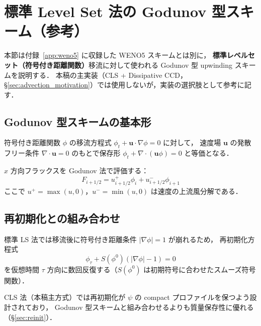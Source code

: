 \section{標準 Level Set 法の Godunov 型スキーム（参考）}
\label{app:godunov_ls}

本節は付録~\ref{app:weno5} に収録した WENO5 スキームとは別に，
\textbf{標準レベルセット（符号付き距離関数）}移流に対して使われる Godunov 型 upwinding スキームを説明する．
本稿の主実装（CLS + Dissipative CCD，§\ref{sec:advection_motivation}）では使用しないが，実装の選択肢として参考に記す．

\subsection{Godunov 型スキームの基本形}

符号付き距離関数 $\phi$ の移流方程式 $\phi_t + \bm{u}\cdot\nabla\phi = 0$ に対して，
速度場 $\bm{u}$ の発散フリー条件 $\nabla\cdot\bm{u}=0$ のもとで保存形 $\phi_t + \nabla\cdot(\bm{u}\phi) = 0$ と等価となる．

$x$ 方向フラックスを Godunov 法で評価する：
\begin{equation}
  F_{i+1/2} = u_{i+1/2}^+ \phi_i + u_{i+1/2}^- \phi_{i+1}
\end{equation}
ここで $u^+ = \max(u, 0)$，$u^- = \min(u, 0)$ は速度の上流風分解である．

\subsection{再初期化との組み合わせ}

標準 LS 法では移流後に符号付き距離条件 $|\nabla\phi| = 1$ が崩れるため，
再初期化方程式
\[
  \phi_\tau + S(\phi^0)(|\nabla\phi|-1) = 0
\]
を仮想時間 $\tau$ 方向に数回反復する（$S(\phi^0)$ は初期符号に合わせたスムーズ符号関数）．

CLS 法（本稿主方式）では再初期化が $\psi$ の compact プロファイルを保つよう設計されており，
Godunov 型スキームと組み合わせるよりも質量保存性に優れる（§\ref{sec:reinit}）．

